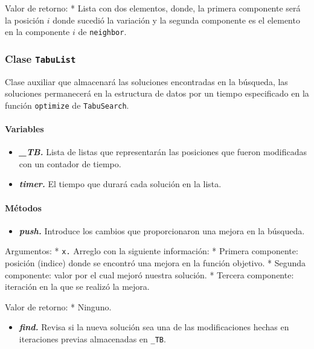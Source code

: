 \documentclass[11pt]{article}
\providecommand{\tightlist}{%
      \setlength{\itemsep}{0pt}\setlength{\parskip}{0pt}}
\begin{document}
Valor de retorno: * Lista con dos elementos, donde, la primera
componente será la posición \(i\) donde sucedió la variación y la
segunda componente es el elemento en la componente \(i\) de
\texttt{neighbor}.

    \subsubsection{\texorpdfstring{Clase
\texttt{TabuList}}{Clase TabuList}}\label{clase-tabulist}

Clase auxiliar que almacenará las soluciones encontradas en la búsqueda,
las soluciones permanecerá en la estructura de datos por un tiempo
especificado en la función \texttt{optimize} de \texttt{TabuSearch}.

\paragraph{Variables}\label{variables}

\begin{itemize}
\tightlist
\item
  \emph{\textbf{\_TB.}} Lista de listas que representarán las posiciones
  que fueron modificadas con un contador de tiempo.
\item
  \emph{\textbf{timer.}} El tiempo que durará cada solución en la lista.
\end{itemize}

\paragraph{Métodos}\label{muxe9todos}

\begin{itemize}
\tightlist
\item
  \emph{\textbf{push.}} Introduce los cambios que proporcionaron una
  mejora en la búsqueda.
\end{itemize}

Argumentos: * \texttt{x.} Arreglo con la siguiente información: *
Primera componente: posición (indice) donde se encontró una mejora en la
función objetivo. * Segunda componente: valor por el cual mejoró nuestra
solución. * Tercera componente: iteración en la que se realizó la
mejora.

Valor de retorno: * Ninguno.

\begin{itemize}
\tightlist
\item
  \emph{\textbf{find.}} Revisa si la nueva solución sea una de las
  modificaciones hechas en iteraciones previas almacenadas en
  \texttt{\_TB}.
\end{itemize}
\end{document}
